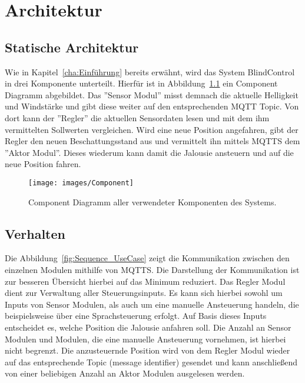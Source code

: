 \chapter{Architektur}
\label{cha:Architektur}

\section{Statische Architektur}
Wie in Kapitel~\ref{cha:Einführung} bereits erwähnt, wird das System BlindControl in drei Komponente unterteilt. Hierfür ist in Abbildung~\ref{fig:component_diagramm} ein Component Diagramm abgebildet. Das ''Sensor Modul'' misst demnach die aktuelle Helligkeit und Windstärke und gibt diese weiter auf den entsprechenden MQTT Topic. Von dort kann der ''Regler'' die aktuellen Sensordaten lesen und mit dem ihm vermittelten Sollwerten vergleichen. Wird eine neue Position angefahren, gibt der Regler den neuen Beschattungsstand aus und vermittelt ihn mittels MQTTS dem ''Aktor Modul''. Dieses wiederum kann damit die Jalousie ansteuern und auf die neue Position fahren.
\begin{figure}[hbt]
	\centering
	\texttt{[image: images/Component]}
	\caption[Component Diagramm]{Component Diagramm aller verwendeter Komponenten des Systems.}
	\label{fig:component_diagramm}
\end{figure}

\section{Verhalten}
Die Abbildung~\ref{fig:Sequence_UseCase} zeigt die Kommunikation zwischen den einzelnen Modulen mithilfe von MQTTS. Die Darstellung der Kommunikation ist zur besseren Übersicht hierbei auf das Minimum reduziert. Das Regler Modul dient zur Verwaltung aller Steuerungsinputs. Es kann sich hierbei sowohl um Inputs von Sensor Modulen, als auch um eine manuelle Ansteuerung handeln, die beispielsweise über eine Sprachsteuerung erfolgt. Auf Basis dieses Inputs entscheidet es, welche Position die Jalousie anfahren soll. Die Anzahl an Sensor Modulen und Modulen, die eine manuelle Ansteuerung vornehmen, ist hierbei nicht begrenzt. Die anzusteuernde Position wird von dem Regler Modul wieder auf das entsprechende Topic (message identifier) gesendet und kann anschließend von einer beliebigen Anzahl an Aktor Modulen ausgelesen werden.

